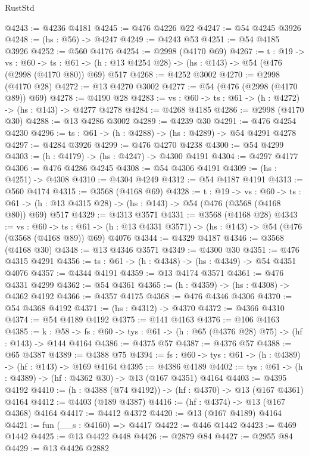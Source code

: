 \begin{lexlean}{RustStd}
\begin{coremodule}
@4243 := @4236 @4181
@4245 := @476 @4226 @22
@4247 := @54 @4245 @3926
@4248 := (hs : @56) -> @4247
@4249 := @4243 @53
@4251 := @54 @4185 @3926
@4252 := @560 @4176
@4254 := @2998 (@4170 @69)
@4267 := {t : @19} ->
  {vs : @60} ->
  {ts : @61} -> (h : @13 @4254 @28) -> (hs : @143) -> @54 (@476 (@2998 (@4170 @80)) @69) @517
@4268 := @4252 @3002
@4270 := @2998 (@4170 @28)
@4272 := @13 @4270 @3002
@4277 := @54 (@476 (@2998 (@4170 @89)) @69)
@4278 := @4190 @28
@4283 := {vs : @60} -> {ts : @61} -> (h : @4272) -> (hs : @143) -> @4277 @4278
@4284 := @4268 @4185
@4286 := @2998 (@4170 @30)
@4288 := @13 @4286 @3002
@4289 := @4239 @30
@4291 := @476 @4254 @4230
@4296 := {ts : @61} -> (h : @4288) -> (hs : @4289) -> @54 @4291 @4278
@4297 := @4284 @3926
@4299 := @476 @4270 @4238
@4300 := @54 @4299
@4303 := (h : @4179) -> (hs : @4247) -> @4300 @4191
@4304 := @4297 @4177
@4306 := @476 @4286 @4245
@4308 := @54 @4306 @4191
@4309 := (hs : @4251) -> @4308
@4310 := @4304 @4249
@4312 := @54 @4187 @4191
@4313 := @560 @4174
@4315 := @3568 (@4168 @69)
@4328 := {t : @19} ->
  {vs : @60} ->
  {ts : @61} -> (h : @13 @4315 @28) -> (hs : @143) -> @54 (@476 (@3568 (@4168 @80)) @69) @517
@4329 := @4313 @3571
@4331 := @3568 (@4168 @28)
@4343 := {vs : @60} ->
  {ts : @61} -> (h : @13 @4331 @3571) -> (hs : @143) -> @54 (@476 (@3568 (@4168 @89)) @69) @4076
@4344 := @4329 @4187
@4346 := @3568 (@4168 @30)
@4348 := @13 @4346 @3571
@4349 := @4300 @30
@4351 := @476 @4315 @4291
@4356 := {ts : @61} -> (h : @4348) -> (hs : @4349) -> @54 @4351 @4076
@4357 := @4344 @4191
@4359 := @13 @4174 @3571
@4361 := @476 @4331 @4299
@4362 := @54 @4361
@4365 := (h : @4359) -> (hs : @4308) -> @4362 @4192
@4366 := @4357 @4175
@4368 := @476 @4346 @4306
@4370 := @54 @4368 @4192
@4371 := (hs : @4312) -> @4370
@4372 := @4366 @4310
@4374 := @54 @4189 @4192
@4375 := @141 @4163
@4376 := @106 @4163
@4385 := {k : @58} ->
  {fs : @60} -> {tys : @61} -> (h : @65 (@4376 @28) @75) -> (hf : @143) -> @144 @4164
@4386 := @4375 @57
@4387 := @4376 @57
@4388 := @65 @4387
@4389 := @4388 @75
@4394 := {fs : @60} -> {tys : @61} -> (h : @4389) -> (hf : @143) -> @169 @4164
@4395 := @4386 @4189
@4402 := {tys : @61} -> (h : @4389) -> (hf : @4362 @30) -> @13 (@167 @4351) @4164
@4403 := @4395 @4192
@4410 := (h : @4388 (@74 @4192)) -> (hf : @4370) -> @13 (@167 @4361) @4164
@4412 := @4403 (@189 @4387)
@4416 := (hf : @4374) -> @13 (@167 @4368) @4164
@4417 := @4412 @4372
@4420 := @13 (@167 @4189) @4164
@4421 := fun (__s : @4160) => @4417
@4422 := @446 @1442
@4423 := @469 @1442
@4425 := @13 @4422 @448
@4426 := @2879 @84
@4427 := @2955 @84
@4429 := @13 @4426 @2882

\end{coremodule}
\end{lexlean}
